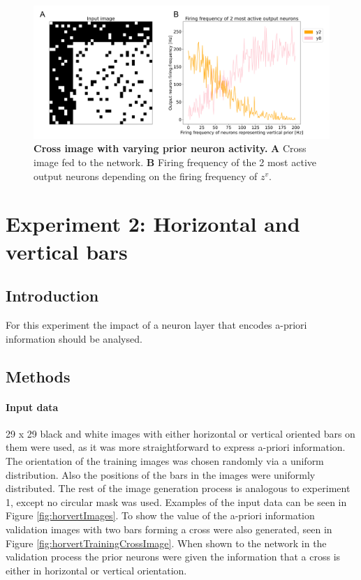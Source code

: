 \begin{figure}
  \includegraphics[width=\linewidth]{figures/horvertAdaptiveInh/YFrequency_prior.png}
  \caption{\textbf{Cross image with varying prior neuron activity.} \textbf{A} Cross image fed to the network. \textbf{B} Firing frequency of the 2 most active output neurons depending on the firing frequency of $z^v$. }
  \label{fig:horvertAdaptiveInhibitionVariablePriorResults}
\end{figure}










\iffalse
\section{Experiment 2: Horizontal and vertical bars}
\label{section:horvert}

 \subsection{Introduction}

For this experiment the impact of a neuron layer that encodes a-priori information should be analysed.

\subsection{Methods}

\paragraph{Input data}
29 x 29 black and white images with either horizontal or vertical oriented bars on them were used, as it was more straightforward to express a-priori information. The orientation of the training images was chosen randomly via a uniform distribution. Also the positions of the bars in the images were uniformly distributed. The rest of the image generation process is analogous to experiment 1, except no circular mask was used. Examples of the input data can be seen in Figure \ref{fig:horvertImages}. To show the value of the a-priori information validation images with two bars forming a cross were also generated, seen in Figure \ref{fig:horvertTrainingCrossImage}. When shown to the network in the validation process the prior neurons were given the information that a cross is either in horizontal or vertical orientation.

